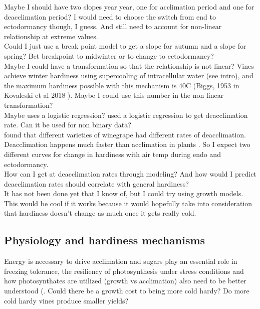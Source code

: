 \documentclass[11pt,letter]{article}
\begin{document}
Maybe I should have two slopes year year, one for acclimation period and one for deacclimation period? I would need to choose the switch from end to ectodormancy though, I guess. And still need to account for non-linear relationship at extreme values. \\ 

Could I just use a break point model to get a slope for autumn and a slope for spring? Bet breakpoint to midwinter or to change to ectodormancy? \\

Maybe I could have a transformation so that the relationship is not linear? Vines achieve winter hardiness using supercooling of intracellular water (see \cite{Kovaleski2018a} intro), and the maximum hardiness possible with this mechanism is 40\textdegree C (Biggs, 1953 in Kovaleski et al 2018 ). Maybe I could use this number in the non linear transformation? \\

Maybe uses a logistic regression? \cite{Kovaleski2018a} used a logistic regression to get deacclimation rate. Can it be used for non binary data?\\

\cite{Kovaleski2018a} found that different varieties of winegrape had different rates of deacclimation. \\ 

Deacclimation happens much faster than acclimation in plants \citep{Kalberer2006}. So I expect two different curves for change in hardiness with air temp during endo and ectodormancy. \\ 

How can I get at deacclimation rates through modeling? And how would I predict deacclimation rates should correlate with general hardiness?\\

It has not been done yet that I know of, but I could try using growth models. This would be cool if it works because it would hopefully take into consideration that hardiness doesn't change as much once it gets really cold.\\ 

\subsection{Physiology and hardiness mechanisms}  
Energy is necessary to drive acclimation and sugars play an essential role in freezing tolerance, the
resiliency of photosynthesis under stress conditions and how photosynthates are utilized (growth vs acclimation) also need to be better understood (\citep{Gusta2013}. Could there be a growth cost to being more cold hardy? Do more cold hardy vines produce smaller yields? \\
\end{document}
